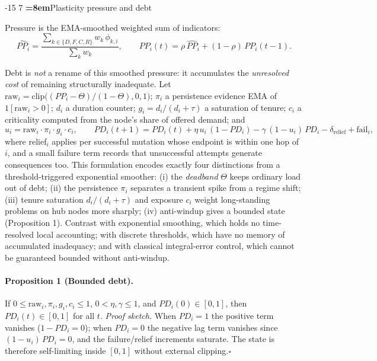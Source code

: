 \documentclass[runningheads]{llncs}
\makeatletter
\renewcommand\subsection{\@startsection{subsection}{2}{\z@}%
  {-15\p@ \@plus -4\p@ \@minus -4\p@}%
  {7\p@ \@plus 4\p@ \@minus 4\p@}%
  {\normalfont\normalsize\bfseries\boldmath\color{vitblue}%
   \rightskip=\z@ \@plus 8em\pretolerance=10000}}
\makeatother
\begin{document}
\subsection{Plasticity pressure and debt}
\label{sec:model-debt}

Pressure is the EMA-smoothed weighted sum of indicators:
\begin{equation}
\widehat{PP}_i = \frac{\sum_{k\in\{D,F,C,R\}} w_k\,\phi_{k,i}}{\sum_k w_k},
\qquad
PP_i(t) = \rho\,\widehat{PP}_i + (1-\rho)\,PP_i(t{-}1).
\label{eq:pressure}
\end{equation}

Debt is \emph{not} a rename of this smoothed pressure: it accumulates the
\emph{unresolved cost} of remaining structurally inadequate. Let
$\text{raw}_i = \mathrm{clip}\bigl((PP_i - \Theta)/(1-\Theta), 0, 1\bigr)$;
$\pi_i$ a persistence evidence EMA of $1[\text{raw}_i > 0]$; $d_i$ a
duration counter; $g_i = d_i/(d_i + \tau)$ a saturation of tenure; $c_i$ a
criticality computed from the node's share of offered demand; and
\begin{equation}
u_i = \text{raw}_i \cdot \pi_i \cdot g_i \cdot c_i,
\qquad
PD_i(t{+}1) = PD_i(t) + \eta\,u_i\,(1 - PD_i) - \gamma\,(1-u_i)\,PD_i
              - \delta_{\text{relief}} + \text{fail}_i,
\label{eq:debt}
\end{equation}
where relief$_i$ applies per successful mutation whose endpoint is within
one hop of $i$, and a small failure term records that unsuccessful
attempts generate consequences too. This formulation encodes exactly four
distinctions from a threshold-triggered exponential smoother: (i) the
\emph{deadband} $\Theta$ keeps ordinary load out of debt; (ii) the
persistence $\pi_i$ separates a transient spike from a regime shift; (iii)
tenure saturation $d_i/(d_i+\tau)$ and exposure $c_i$ weight long-standing
problems on hub nodes more sharply; (iv) anti-windup gives a bounded state
(Proposition 1). Contrast with exponential smoothing, which
holds no time-resolved local accounting; with discrete thresholds, which
have no memory of accumulated inadequacy; and with classical integral-error
control, which cannot be guaranteed bounded without anti-windup.

\paragraph{Proposition 1 (Bounded debt).}
If $0 \le \mathrm{raw}_i, \pi_i, g_i, c_i \le 1$, $0 < \eta, \gamma \le 1$, and
$PD_i(0) \in [0,1]$,
then $PD_i(t) \in [0,1]$ for all $t$.
\emph{Proof sketch.} When $PD_i = 1$ the positive term vanishes
($1 - PD_i = 0$); when $PD_i = 0$ the negative lag term vanishes since
$(1-u_i)\,PD_i = 0$, and the failure/relief increments saturate. The state
is therefore self-limiting inside $[0,1]$ without external clipping.\hfill$\square$
\end{document}
